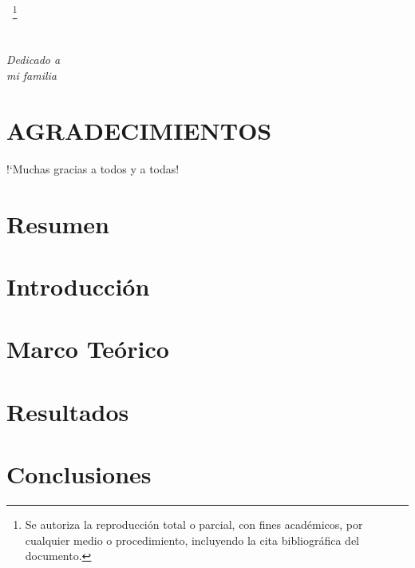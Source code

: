 \documentclass[a4paper,openright,12pt]{book}
\begin{document}
$\ $
\footnote{
Se autoriza la reproducción total o parcial, con fines académicos, por cualquier medio o procedimiento, incluyendo la cita bibliográfica del documento.}
%
\chapter*{}
\setcounter{page}{3}
\begin{flushright}
\textit{Dedicado a \\
mi familia}
\end{flushright}
\chapter*{AGRADECIMIENTOS} 
!`Muchas gracias a todos y a todas!

\tableofcontents

\cleardoublepage
{} 
\listoffigures

\cleardoublepage
{} 
\listoftables 

\newpage
\chapter*{Resumen}\label{cap.resumen} %

	\chapter{Introducción}\label{cap.introduccion}
	

\chapter{Marco Teórico}\label{cuerpodelatesis}
	

\chapter{Resultados}\label{capresultados}
	

\chapter{Conclusiones}\label{conclusiones}
	


 

\newpage
\end{document}
